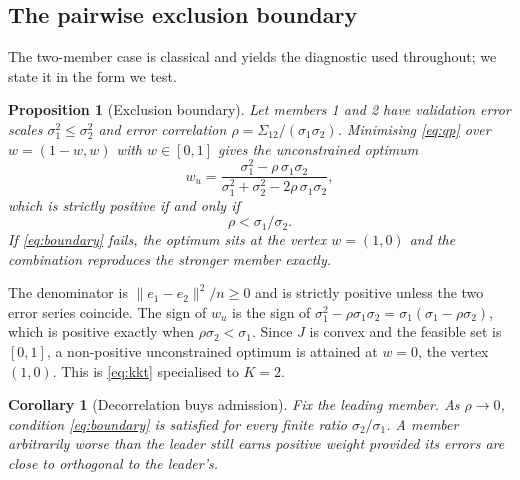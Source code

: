 \documentclass[journal]{IEEEtran}
\newtheorem{proposition}{Proposition}
\newtheorem{corollary}{Corollary}
\begin{document}
\subsection{The pairwise exclusion boundary}
The two-member case is classical \cite{r32,r33} and yields the diagnostic used throughout; we state it in the form we test.
\begin{proposition}[Exclusion boundary]
\label{prop:boundary}
Let members 1 and 2 have validation error scales $\sigma_1^2 \leq \sigma_2^2$ and error correlation $\rho = \Sigma_{12}/(\sigma_1 \sigma_2)$. Minimising \eqref{eq:qp} over $w = (1-w, w)$ with $w \in [0,1]$ gives the unconstrained optimum
\begin{equation}
w_u = \frac{\sigma_1^2 - \rho\, \sigma_1 \sigma_2}{\sigma_1^2 + \sigma_2^2 - 2\rho\, \sigma_1 \sigma_2},
\label{eq:wu}
\end{equation}
which is strictly positive if and only if
\begin{equation}
\rho < \sigma_1/\sigma_2 .
\label{eq:boundary}
\end{equation}
If \eqref{eq:boundary} fails, the optimum sits at the vertex $w = (1,0)$ and the combination reproduces the stronger member exactly.
\end{proposition}
\begin{IEEEproof}
The denominator is $\|e_1 - e_2\|^2/n \geq 0$ and is strictly positive unless the two error series coincide. The sign of $w_u$ is the sign of $\sigma_1^2 - \rho \sigma_1 \sigma_2 = \sigma_1(\sigma_1 - \rho \sigma_2)$, which is positive exactly when $\rho \sigma_2 < \sigma_1$. Since $J$ is convex and the feasible set is $[0,1]$, a non-positive unconstrained optimum is attained at $w = 0$, the vertex $(1,0)$. This is \eqref{eq:kkt} specialised to $K = 2$.
\end{IEEEproof}
\begin{corollary}[Decorrelation buys admission]
\label{cor:admission}
Fix the leading member. As $\rho \to 0$, condition \eqref{eq:boundary} is satisfied for every finite ratio $\sigma_2/\sigma_1$. A member arbitrarily worse than the leader still earns positive weight provided its errors are close to orthogonal to the leader's.
\end{corollary}
\end{document}
